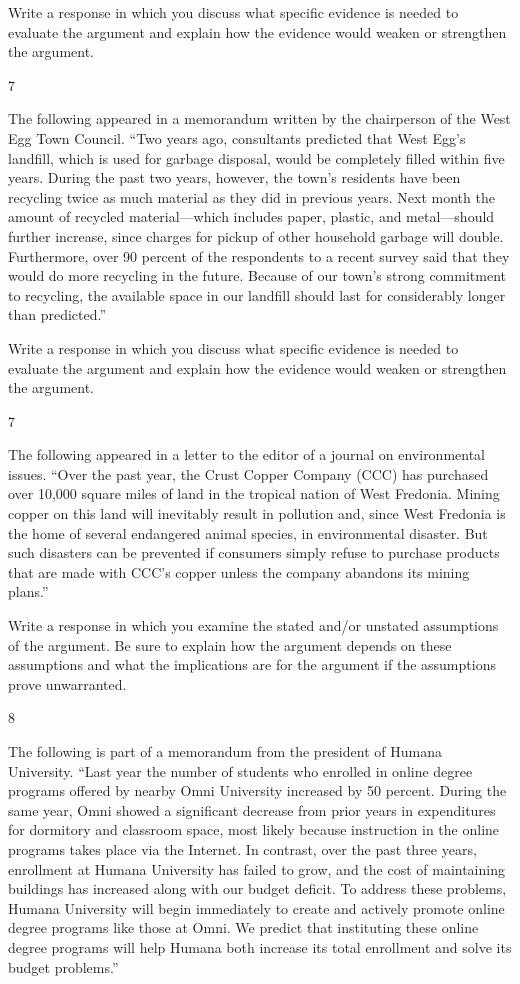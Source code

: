 \documentclass[]{article}
\begin{document}
Write a response in which you discuss what specific evidence is needed
to evaluate the argument and explain how the evidence would weaken or
strengthen the argument.

7

The following appeared in a memorandum written by the chairperson of the
West Egg Town Council. ``Two years ago, consultants predicted that West
Egg's landfill, which is used for garbage disposal, would be completely
filled within five years. During the past two years, however, the town's
residents have been recycling twice as much material as they did in
previous years. Next month the amount of recycled material---which
includes paper, plastic, and metal---should further increase, since
charges for pickup of other household garbage will double. Furthermore,
over 90 percent of the respondents to a recent survey said that they
would do more recycling in the future. Because of our town's strong
commitment to recycling, the available space in our landfill should last
for considerably longer than predicted.''

Write a response in which you discuss what specific evidence is needed
to evaluate the argument and explain how the evidence would weaken or
strengthen the argument.

7

The following appeared in a letter to the editor of a journal on
environmental issues. ``Over the past year, the Crust Copper Company
(CCC) has purchased over 10,000 square miles of land in the tropical
nation of West Fredonia. Mining copper on this land will inevitably
result in pollution and, since West Fredonia is the home of several
endangered animal species, in environmental disaster. But such disasters
can be prevented if consumers simply refuse to purchase products that
are made with CCC's copper unless the company abandons its mining
plans.''

Write a response in which you examine the stated and/or unstated
assumptions of the argument. Be sure to explain how the argument depends
on these assumptions and what the implications are for the argument if
the assumptions prove unwarranted.

8

The following is part of a memorandum from the president of Humana
University. ``Last year the number of students who enrolled in online
degree programs offered by nearby Omni University increased by 50
percent. During the same year, Omni showed a significant decrease from
prior years in expenditures for dormitory and classroom space, most
likely because instruction in the online programs takes place via the
Internet. In contrast, over the past three years, enrollment at Humana
University has failed to grow, and the cost of maintaining buildings has
increased along with our budget deficit. To address these problems,
Humana University will begin immediately to create and actively promote
online degree programs like those at Omni. We predict that instituting
these online degree programs will help Humana both increase its total
enrollment and solve its budget problems.''
\end{document}
